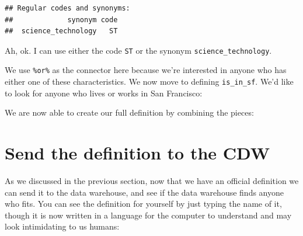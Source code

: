 \documentclass[]{book}
\newenvironment{Shaded}{\begin{snugshade}}{\end{snugshade}}
\newcommand{\KeywordTok}[1]{\textcolor[rgb]{0.13,0.29,0.53}{\textbf{#1}}}
\newcommand{\NormalTok}[1]{#1}
\newcommand{\OperatorTok}[1]{\textcolor[rgb]{0.81,0.36,0.00}{\textbf{#1}}}
\newcommand{\StringTok}[1]{\textcolor[rgb]{0.31,0.60,0.02}{#1}}
\begin{document}
\begin{verbatim}
## Regular codes and synonyms:
##             synonym code
##  science_technology   ST
\end{verbatim}

Ah, ok. I can use either the code \texttt{ST} or the synonym \texttt{science\_technology}.

\begin{Shaded}
\end{Shaded}

We use \texttt{\%or\%} as the connector here because we're interested in anyone who has either one of these characteristics. We now move to defining \texttt{is\_in\_sf}. We'd like to look for anyone who lives or works in San Francisco:

\begin{Shaded}
\end{Shaded}

We are now able to create our full definition by combining the pieces:

\begin{Shaded}
\end{Shaded}

\hypertarget{send-the-definition-to-the-cdw}{%
\section{Send the definition to the CDW}\label{send-the-definition-to-the-cdw}}

As we discussed in the previous section, now that we have an official definition we can send it to the data warehouse, and see if the data warehouse finds anyone who fits. You can see the definition for yourself by just typing the name of it, though it is now written in a language for the computer to understand and may look intimidating to us humans:
\end{document}
